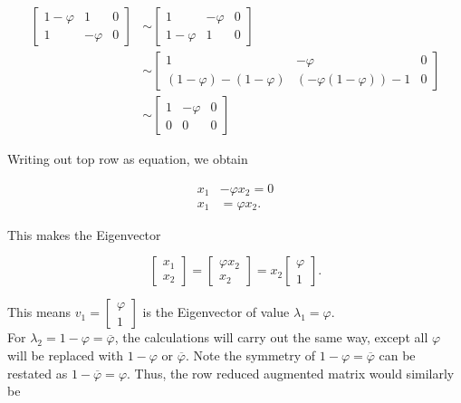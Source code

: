 \documentclass{article}
\begin{document}
\begin{align*}
    \left[ \begin{array}{cc|c} 1- \varphi & 1 & 0 \\ 1 & -\varphi & 0 \end{array} \right] &\sim \left[ \begin{array}{cc|c}  1 & -\varphi & 0 \\ 1-\varphi & 1 & 0 \end{array} \right] \\
    &\sim \left[ \begin{array}{cc|c}  1 & -\varphi & 0 \\ (1-\varphi)- (1-\varphi) & (-\varphi(1- \varphi))-1 & 0 \end{array} \right] \\
    &\sim \left[ \begin{array}{cc|c} 1 &  -\varphi & 0 \\ 0  & 0 & 0 \end{array}  \right]
\end{align*} 

Writing out top row as equation, we obtain

\begin{align*}
    x_1 &-\varphi x_2 = 0\\
    x_1 &= \varphi x_2.
\end{align*}

This makes the Eigenvector

\begin{equation*}
    \begin{bmatrix} x_1 \\ x_2 \end{bmatrix} = \begin{bmatrix} \varphi x_2 \\ x_2 \end{bmatrix} = x_2 \begin{bmatrix} \varphi \\ 1 \end{bmatrix}.
\end{equation*}

This means $v_1=\begin{bmatrix} \varphi \\ 1 \end{bmatrix}$ is the Eigenvector of value $\lambda_1=\varphi$. \\

For $\lambda_2=1-\varphi=\overline{\varphi}$, the calculations will carry out the same way, except all $\varphi$ will be replaced with $1-\varphi$ or $\overline{\varphi}$. Note the symmetry of $1-\varphi=\overline{\varphi}$ can be restated as $1-\overline{\varphi}=\varphi$. Thus, the row reduced augmented matrix would similarly be 
\end{document}
